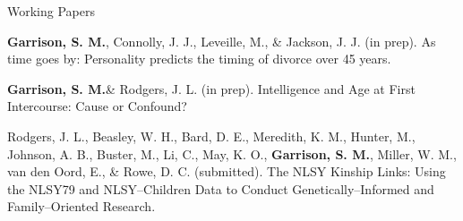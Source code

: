 \documentclass {resume}
\newlength{\wideitemsep}
\let\olditem\item
\renewcommand{\item}{\setlength{\itemsep}{\wideitemsep}\olditem}
\newcommand{\meb}{{\bf Garrison, S. M.}\xspace}
\begin{document}
\begin{comment}\begin{rSection}{\textrm{Published Abstracts}}
\begin{etaremune}\item\meb (2013). Domestic dissatis{\em fiction} or dissatis{\em fact}ion?: Gender differences in a multilevel model of marital satisfaction using prenuptial marital expectations after 20 years. [Abstract] {\em Washington University Senior Honors Thesis Abstracts. 5}, 166.\end{etaremune}\end{rSection}\end{comment}%

\begin{comment}
\begin{itemize}

\end{itemize}
\end{comment}
\begin{rSection}{\textrm{Working Papers}}
\begin{etaremune}\item\meb, Connolly, J. J., Leveille, M., \& Jackson, J. J. (in prep). As time goes by: Personality predicts the timing of divorce over 45 years. %
\item\meb \& Rodgers, J. L. (in prep). Intelligence and Age at First Intercourse: Cause or Confound?%
\item Rodgers, J. L., Beasley, W. H., Bard, D. E., Meredith, K. M., Hunter, M., Johnson, A. B., Buster, M., Li, C., May, K. O., \meb, Miller, W. M., van den Oord, E., \& Rowe, D. C. (submitted). The NLSY Kinship Links: Using the NLSY79 and NLSY--Children Data to Conduct Genetically--Informed and Family--Oriented Research.
\end{etaremune}
\end{rSection}
\end{document}
